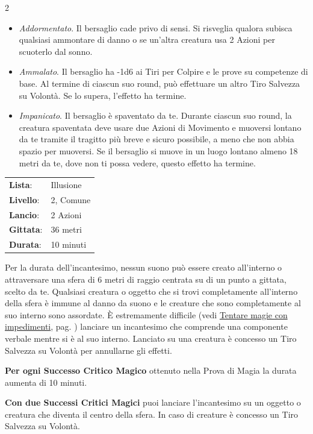 \begin{multicols}{2}
\begin{itemize}[leftmargin=*] \setlength{\itemsep}{0pt}
	\item \emph{Addormentato}. Il bersaglio cade privo di sensi. Si risveglia qualora subisca qualsiasi ammontare di danno o se un'altra creatura usa 2 Azioni per scuoterlo dal sonno.
	\item \emph{Ammalato}. Il bersaglio ha -1d6 ai Tiri per Colpire e le prove su competenze di base. Al termine di ciascun suo round, può effettuare un altro Tiro Salvezza su Volontà. Se lo supera, l'effetto ha termine.
	\item \emph{Impanicato}. Il bersaglio è spaventato da te. Durante ciascun suo round, la creatura spaventata deve usare due Azioni di Movimento e muoversi lontano da te tramite il tragitto più breve e sicuro possibile, a meno che non abbia spazio per muoversi. Se il bersaglio si muove in un luogo lontano almeno 18 metri da te, dove non ti possa vedere, questo effetto ha termine.
\end{itemize}

\noindent\begin{tabularx}{\linewidth}{p{1.9cm}X}
	\rowcolor{gray!20}\textbf{Lista}: & Illusione \\
	\textbf{Livello}: & 2, Comune \\
	\rowcolor{gray!20}\textbf{Lancio}: & 2 Azioni \\
	\textbf{Gittata}: & 36 metri \\
	\rowcolor{gray!20}\textbf{Durata}: & 10 minuti \\
\end{tabularx}\smallskip

Per la durata dell'incantesimo, nessun suono può essere creato all'interno o attraversare una sfera di 6 metri di raggio centrata su di un punto a gittata, scelto da te. Qualsiasi creatura o oggetto che si trovi completamente all'interno della sfera è immune al danno da suono e le creature che sono completamente al suo interno sono assordate. È estremamente difficile (vedi \hyperlink{magieconimpedimenti}{Tentare magie con impedimenti}, pag. \pageref{magieconimpedimenti} ) lanciare un incantesimo che comprende una componente verbale mentre si è al suo interno. Lanciato su una creatura è concesso un Tiro Salvezza su Volontà per annullarne gli effetti.

\textbf{Per ogni Successo Critico Magico} ottenuto nella Prova di Magia la durata aumenta di 10 minuti.

\textbf{Con due Successi Critici Magici} puoi lanciare l'incantesimo su un oggetto o creatura che diventa il centro della sfera. In caso di creature è concesso un Tiro Salvezza su Volontà.


\end{multicols}
